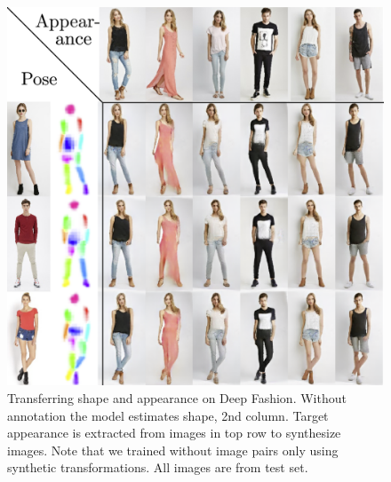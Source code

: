 %
\begin{figure}[t]
	\centering
	\includegraphics[trim={0cm 0cm 0cm 0cm},clip, width=1.\linewidth]{fig/swappy}
	\caption{Transferring shape and appearance on Deep Fashion. Without annotation the model estimates shape, 2nd column. Target appearance is extracted from images in top row to synthesize images. Note that we trained without image pairs only using synthetic transformations.
	All images are from test set.}
	\label{fig:allswaps}
\end{figure}
%

